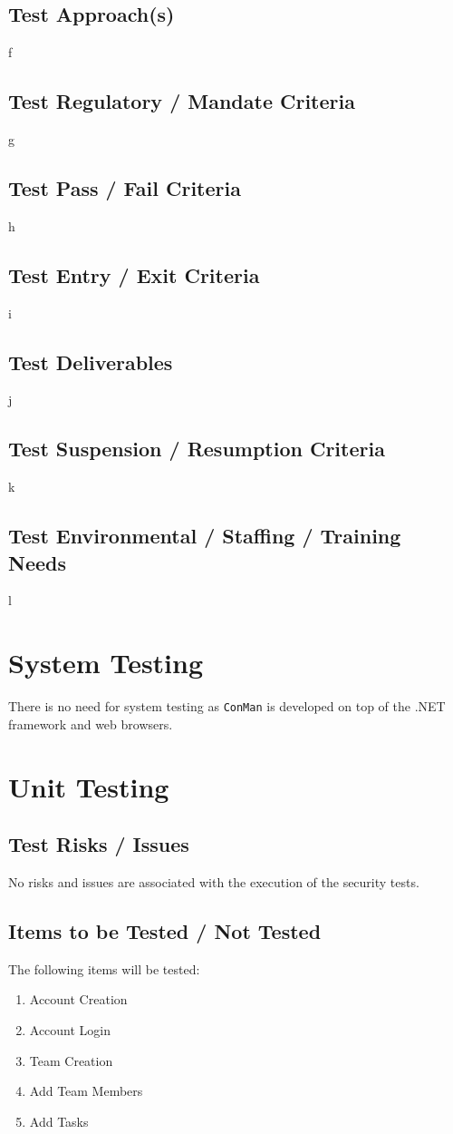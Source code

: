 \documentclass{article}
\begin{document}
\subsection{Test Approach(s)}
f

\subsection{Test Regulatory / Mandate Criteria}
g

\subsection{Test Pass / Fail Criteria}
h

\subsection{Test Entry / Exit Criteria}
i

\subsection{Test Deliverables}
j

\subsection{Test Suspension / Resumption Criteria}
k

\subsection{Test Environmental / Staffing / Training Needs}
l

\section{System Testing}
There is no need for system testing as \texttt{ConMan} is developed on top 
of the .NET framework and web browsers.

\newpage
\section{Unit Testing}
\subsection{Test Risks / Issues}
No risks and issues are associated with the execution of the security tests.

\subsection{Items to be Tested / Not Tested}
The following items will be tested:
\begin{enumerate}
\item Account Creation
\item Account Login
\item Team Creation
\item Add Team Members
\item Add Tasks
\end{enumerate}
\end{document}

